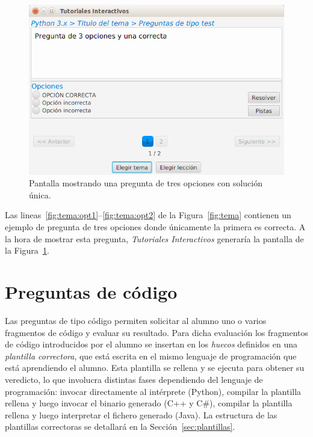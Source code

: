 \documentclass[]{article}
\newcommand{\toolname}{\emph{Tutoriales Interactivos}}
\begin{document}
\begin{figure}[tb]
	\centerline{\includegraphics[scale=0.5]{opciones}}
	\caption{Pantalla mostrando una pregunta de tres opciones con solución única.\label{fig:opciones}}
\end{figure}

Las lineas~\ref{fig:tema:opt1}--\ref{fig:tema:opt2} de la Figura~\ref{fig:tema} contienen un ejemplo de pregunta de tres opciones donde únicamente la primera es correcta. A la hora de mostrar esta pregunta, \toolname{} generaría la pantalla de la Figura~\ref{fig:opciones}.

\section{Preguntas de código}
Las preguntas de tipo código permiten solicitar al alumno uno o varios fragmentos de código y evaluar su resultado. Para dicha evaluación los fragmentos de código introducidos por el alumno se insertan en los \emph{huecos} definidos en una \emph{plantilla correctora}, que está escrita en el mismo lenguaje de programación que está aprendiendo el alumno. Esta plantilla se rellena y se ejecuta para obtener su veredicto, lo que involucra distintas fases dependiendo del lenguaje de programación: invocar directamente al intérprete (Python), compilar la plantilla rellena y luego invocar el binario generado (C++ y C\#), compilar la plantilla rellena y luego interpretar el fichero generado (Java). La estructura de las plantillas correctoras se detallará en la Sección~\ref{sec:plantillas}.
\end{document}
